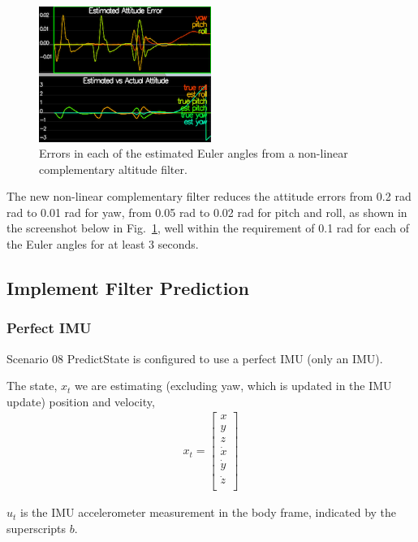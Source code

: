 \documentclass[letterpaper]{article}
\begin{document}
\begin{figure}[ht]
\centering
\includegraphics[width=0.5\textwidth]{./images/scenario7_2.png}
\caption{\label{fig:nonlinear_comp_filter} Errors in each of the estimated Euler angles from a non-linear complementary altitude filter.}
\end{figure}

The new non-linear complementary filter reduces the attitude errors from 0.2 rad rad to 0.01 rad for yaw, from 0.05 rad to 0.02 rad for pitch and roll, as shown in the screenshot below in Fig.~\ref{fig:nonlinear_comp_filter}, well within the requirement of 0.1 rad for each of the Euler angles for at least 3 seconds.

\subsection{Implement Filter Prediction}

\subsubsection{Perfect IMU}

Scenario 08 PredictState is configured to use a perfect IMU (only an IMU). 

The state, $x_t$ we are estimating (excluding yaw, which is updated in the IMU update) position and velocity,
\begin{align*}
  x_t = \left[\begin{array}{c} 
      x\\
      y\\
      z\\
      \dot{x}\\
      \dot{y}\\
      \dot{z}\\
      \end{array}\right]
\end{align*}

$u_t$ is the IMU accelerometer measurement in the body frame, indicated by the superscripts $b$. 
\end{document}

